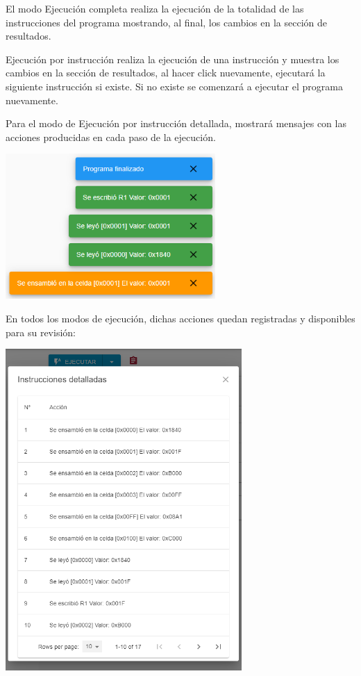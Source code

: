 El modo Ejecución completa realiza la ejecución de la totalidad de las instrucciones del programa mostrando, al final, los cambios en la sección de resultados. 

Ejecución por instrucción realiza la ejecución de una instrucción y muestra los cambios en la sección de resultados, al hacer click nuevamente, ejecutará la siguiente instrucción si existe. Si no existe se comenzará a ejecutar el programa nuevamente.

Para el modo de Ejecución por instrucción detallada, mostrará mensajes con las acciones producidas en cada paso de la ejecución. 

\begin{center}
  \includegraphics[width=8cm]{figuras/ejecucion_detallada.png}
\end{center}

En todos los modos de ejecución, dichas acciones quedan registradas y disponibles para su revisión:

\begin{center}
  \includegraphics[width=9cm]{figuras/instrucciones_detalladas.PNG}
\end{center}

